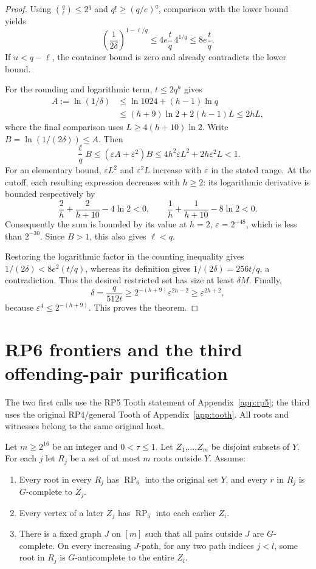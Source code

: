 \documentclass[11pt,a4paper]{article}
\theoremstyle{definition}
\theoremstyle{remark}
\numberwithin{equation}{section}
\begin{document}
\begin{proof}
Using \(\binom{q}{\ell}\le2^q\) and \(q!\ge(q/e)^q\), comparison with the lower bound yields
\[
 \left(\frac1{2\delta}\right)^{1-\ell/q}
 \le4e\frac tq\,4^{1/q}\le8e\frac tq.
\]
If \(u<q-\ell\), the container bound is zero and already contradicts the lower bound.

For the rounding and logarithmic term, \(t\le2q^h\) gives
\begin{align*}
 A:=\ln(1/\delta)&\le\ln1024+(h-1)\ln q\\
 &\le(h+9)\ln2+2(h-1)L\le2hL,
\end{align*}
where the final comparison uses \(L\ge4(h+10)\ln2\). Write \(B=\ln(1/(2\delta))\le A\). Then
\[
 \frac\ell q B\le(\varepsilon A+\varepsilon^2)B
 \le4h^2\varepsilon L^2+2h\varepsilon^2L<1.
\]
For an elementary bound, \(\varepsilon L^2\) and \(\varepsilon^2L\) increase with \(\varepsilon\) in the stated range. At the cutoff, each resulting expression decreases with \(h\ge2\): its logarithmic derivative is bounded respectively by
\[
 \frac2h+\frac2{h+10}-4\ln2<0,\qquad
 \frac1h+\frac1{h+10}-8\ln2<0.
\]
Consequently the sum is bounded by its value at \(h=2\), \(\varepsilon=2^{-48}\), which is less than \(2^{-30}\). Since \(B>1\), this also gives \(\ell<q\).

Restoring the logarithmic factor in the counting inequality gives \(1/(2\delta)<8e^2(t/q)\), whereas its definition gives \(1/(2\delta)=256t/q\), a contradiction. Thus the desired restricted set has size at least \(\delta M\). Finally,
\[
 \delta=\frac q{512t}\ge2^{-(h+9)}\varepsilon^{2h-2}
 \ge\varepsilon^{2h+2},
\]
because \(\varepsilon^4\le2^{-(h+9)}\). This proves the theorem.
\end{proof}


\section{RP6 frontiers and the third offending-pair purification}\label{app:rp6front}

The two first calls use the RP5 Tooth statement of Appendix~\ref{app:rp5}; the third uses the original RP4/general Tooth of Appendix~\ref{app:tooth}. All roots and witnesses belong to the same original host.

Let \(m\ge\allowbreak 2^{16}\) be an integer and \(0<\tau\le\allowbreak 1\). Let \(Z_{1}\),...,\(Z_{m}\) be disjoint subsets of \(Y\). For each \(j\) let \(R_{j}\) be a set of at most \(m\) roots outside \(Y\). Assume:

\begin{enumerate}[label=(\Roman*)]
\item Every root in every \(R_{j}\) has \(\operatorname{RP}_{6}\) into the original set \(Y\), and every \(r\) in \(R_{j}\) is \(G\)-complete to \(Z_{j}\).
\item Every vertex of a later \(Z_{j}\) has \(\operatorname{RP}_{5}\) into each earlier \(Z_{i}\).
\item There is a fixed graph \(J\) on \([m]\) such that all pairs outside \(J\) are \(G\)-complete. On every increasing \(J\)-path, for any two path indices \(j<l\), some root in \(R_{j}\) is \(G\)-anticomplete to the entire \(Z_{l}\).
\end{enumerate}
\end{document}
